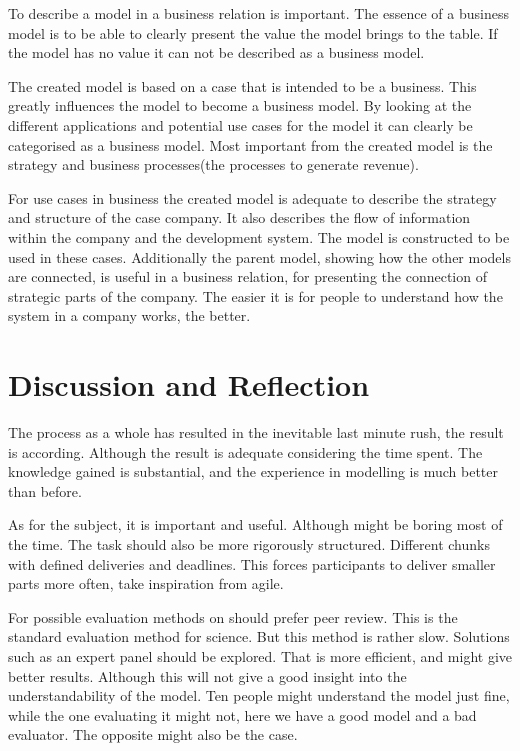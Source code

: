 \documentclass[12pt, a4paper]{article}
\begin{document}
To describe a model in a business relation is important. The essence of a
business model is to be able to clearly present the value the model brings to
the table. If the model has no value it can not be described as a business
model.   

The created model is based on a case that is intended to be a business. This
greatly influences the model to become a business model. By looking at the
different applications and potential use cases for the model it can clearly be
categorised as a business model. Most important from the created model is the
strategy and business processes(the processes to generate revenue).   

For use cases in business the created model is adequate to describe the
strategy and structure of the case company. It also describes the flow of
information within the company and the development system. The model is
constructed to be used in these cases. Additionally the parent model, showing
how the other models are connected, is useful in a business relation, for
presenting the connection of strategic parts of the company. The easier it is
for people to understand how the system in a company works, the better.   

\section{Discussion and Reflection}

The process as a whole has resulted in the inevitable last minute rush, the
result is according. Although the result is adequate considering the time
spent. The knowledge gained is substantial, and the experience in modelling is
much better than before. 

As for the subject, it is important and useful. Although might be boring most
of the time. The task should also be more rigorously structured. Different
chunks with defined deliveries and deadlines. This forces participants to
deliver smaller parts more often, take inspiration from agile. 

For possible evaluation methods on should prefer peer review. This is the
standard evaluation method for science. But this method is rather slow.
Solutions such as an expert panel should be explored. That is more efficient,
and might give better results. Although this will not give a good insight into
the understandability of the model. Ten people might understand the model just
fine, while the one evaluating it might not, here we have a good model and a
bad evaluator. The opposite might also be the case. 
\end{document}
